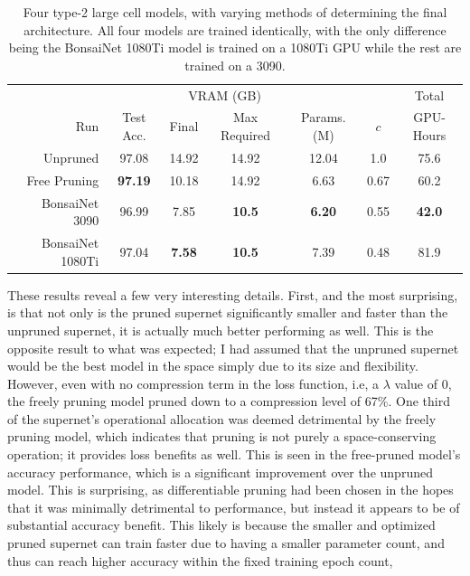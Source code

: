 \begin{table}[h]
\begin{center}
	\begin{tabular}{r|c|c|c|c|c|c}
	 & & \multicolumn{2}{c|}{VRAM (GB)} & & & Total \\
	 Run & Test Acc. & Final & Max Required & Params. (M) & $c$ & GPU-Hours \\
	\hline
	Unpruned & 97.08 & 14.92 & 14.92 & 12.04 & 1.0 & 75.6 \\
	Free Pruning & \textbf{97.19} & 10.18 & 14.92 & 6.63 & 0.67 & 60.2 \\ \hline
	\hline
	BonsaiNet 3090	  & 96.99 & 7.85 & \textbf{10.5} & \textbf{6.20}  & 0.55 & \textbf{42.0} \\
	BonsaiNet 1080Ti  & 97.04 & \textbf{7.58} & \textbf{10.5} & 7.39  & 0.48 & 81.9 \\
	\end{tabular}
\end{center}
\caption[The performance of four type-2 large cell models]{Four type-2 large cell models, with varying methods of determining the final architecture.
All four models are trained identically, with the only difference being the BonsaiNet 1080Ti model is trained on a 1080Ti GPU while the
rest are trained on a 3090.}
\label{tab:pruning3090}
\end{table}

These results reveal a few very interesting details. First, and the most surprising, is that not only is the pruned
supernet significantly smaller and faster than the unpruned supernet, it is actually much better performing as well.
This is the opposite result to what was expected; I had assumed that the unpruned supernet would be the best model in the
space simply due to its size and flexibility. However, even with no compression term in the loss function, i.e, a $\lambda$
value of 0, the freely pruning model pruned down to a compression level of 67\%. One third of the supernet's
operational allocation was deemed detrimental by the freely pruning model, which indicates that pruning is not purely
a space-conserving operation; it provides loss benefits as well. This is seen in the free-pruned model's accuracy
performance, which is a significant improvement over the unpruned model. This is surprising, as differentiable pruning
had been chosen in the hopes that it was minimally detrimental to performance, but instead it appears to be of
substantial accuracy benefit. This likely is because the smaller and optimized pruned supernet can train faster due to having a smaller
parameter count, and thus can reach higher accuracy within the fixed training epoch count,

